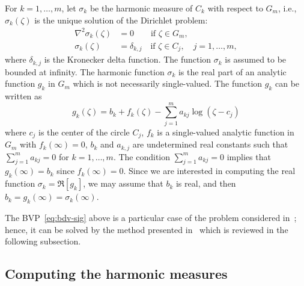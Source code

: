For $k=1,\ldots,m$, let $\sigma_k$ be the harmonic measure of $C_k$ with respect to $G_m$, i.e., $\sigma_k(\zeta)$ is the unique solution of the Dirichlet problem:
\begin{subequations}\label{eq:bdv-sig}
	\begin{align}
	\label{eq:sig-Lap}
	\nabla^2 \sigma_k(\zeta) &= 0 \quad\quad \mbox{if }\zeta\in G_m, \\
	\label{eq:sig-j}
	\sigma_k(\zeta)&= \delta_{k,j} \quad \mbox{if }\zeta\in C_j, \quad j=1,\ldots,m, 
	\end{align}
\end{subequations}
where $\delta_{k,j}$ is the Kronecker delta function.
The function $\sigma_k$ is assumed to be bounded at infinity. 
The harmonic function $\sigma_k$ is the real part of an analytic function $g_k$ in $G_m$ which is not necessarily single-valued. The function $g_k$ can be written as~\cite{Gak,garmar}
\begin{equation}\label{eq:F-u}
g_k(\zeta)=b_k+f_k(\zeta)-\sum_{j=1}^{m} a_{kj}\log(\zeta-c_j)
\end{equation}
where  $c_j$ is the center of the circle $C_j$, $f_k$ is a single-valued analytic function in $G_m$ with $f_k(\infty)=0$, $b_k$ and $a_{k,j}$ are undetermined real constants such that $\sum_{j=1}^{m}a_{kj}=0$ for $k=1,\ldots,m$. The condition $\sum_{j=1}^{m}a_{kj}=0$ implies that $g_k(\infty)=b_k$ since $f_k(\infty)=0$. Since we are interested in computing the real function $\sigma_k=\Re[g_k]$, we may assume that $b_k$ is real, and then $b_k=g_k(\infty)=\sigma_k(\infty)$.

The BVP~\eqref{eq:bdv-sig} above is a particular case of the problem considered in~\cite[Eq.~(4)]{Nvm}; hence, it can be solved by the method presented in~\cite{Nvm} which is reviewed in the following subsection. 


\subsection{Computing the harmonic measures}

